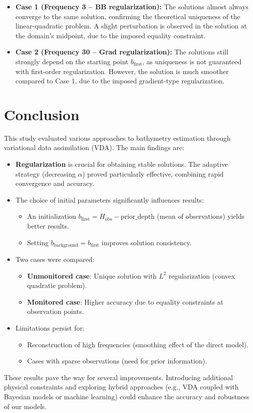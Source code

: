 \documentclass{article}
\begin{document}
\begin{itemize}
    \item \textbf{Case 1 (Frequency 3 – BB regularization):}  
    The solutions almost always converge to the same solution, confirming the theoretical uniqueness of the linear-quadratic problem. A slight perturbation is observed in the solution at the domain's midpoint, due to the imposed equality constraint.

    \item \textbf{Case 2 (Frequency 30 – Grad regularization):}  
    The solutions still strongly depend on the starting point \( b_{\text{first}} \), as uniqueness is not guaranteed with first-order regularization. However, the solution is much smoother compared to Case 1, due to the imposed gradient-type regularization.
\end{itemize}

\section{Conclusion}

This study evaluated various approaches to bathymetry estimation through variational data assimilation (VDA). The main findings are:

\begin{itemize}
    \item \textbf{Regularization} is crucial for obtaining stable solutions. The adaptive strategy (decreasing \( \alpha \)) proved particularly effective, combining rapid convergence and accuracy.

    \item The choice of initial parameters significantly influences results:
    \begin{itemize}
        \item An initialization \( b_{\text{first}} = H_{\text{obs}} - \text{prior\_depth} \) (mean of observations) yields better results.
        \item Setting \( b_{\text{background}} = b_{\text{first}} \) improves solution consistency.
    \end{itemize}

    \item Two cases were compared:
    \begin{itemize}
        \item \textbf{Unmonitored case}: Unique solution with \( L^2 \) regularization (convex quadratic problem).
        \item \textbf{Monitored case}: Higher accuracy due to equality constraints at observation points.
    \end{itemize}

    \item Limitations persist for:
    \begin{itemize}
        \item Reconstruction of high frequencies (smoothing effect of the direct model).
        \item Cases with sparse observations (need for prior information).
    \end{itemize}
\end{itemize}

These results pave the way for several improvements. Introducing additional physical constraints and exploring hybrid approaches (e.g., VDA coupled with Bayesian models or machine learning) could enhance the accuracy and robustness of our models.
\end{document}
